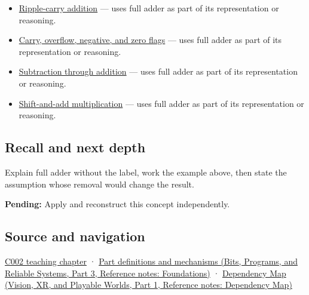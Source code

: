 \hypertarget{appendix-d1a5b1e520c2-used-by}{}

\begin{itemize}
\tightlist
\item
  \hyperref[appendix-17917d9fdbe3]{Ripple-carry addition} --- uses full adder as part of its representation or reasoning.
\item
  \hyperref[appendix-8d687c9c08ab]{Carry, overflow, negative, and zero flags} --- uses full adder as part of its representation or reasoning.
\item
  \hyperref[appendix-1c7df340573e]{Subtraction through addition} --- uses full adder as part of its representation or reasoning.
\item
  \hyperref[appendix-a65290d66ed9]{Shift-and-add multiplication} --- uses full adder as part of its representation or reasoning.
\end{itemize}

\subsection{Recall and next depth}\label{appendix-d1a5b1e520c2-recall-and-next-depth}

\hypertarget{appendix-d1a5b1e520c2-recall-and-next-depth}{}

Explain full adder without the label, work the example above, then state the assumption whose removal would change the result.

\textbf{Pending:} Apply and reconstruct this concept independently.

\subsection{Source and navigation}\label{appendix-d1a5b1e520c2-source-and-navigation}

\hypertarget{appendix-d1a5b1e520c2-source-and-navigation}{}

\hyperref[01-foundations-i-ch001-arithmetic-becomes-a-policy]{C002 teaching chapter} · \href{../01-Bits-Programs-and-Reliable-Systems-P03/main.pdf\#appendix-fd090d982a15}{Part definitions and mechanisms (Bits, Programs, and Reliable Systems, Part 3, Reference notes: Foundations)} · \href{../07-Vision-XR-and-Playable-Worlds-P01/main.pdf\#appendix-4ad47bdd269a}{Dependency Map (Vision, XR, and Playable Worlds, Part 1, Reference notes: Dependency Map)}

